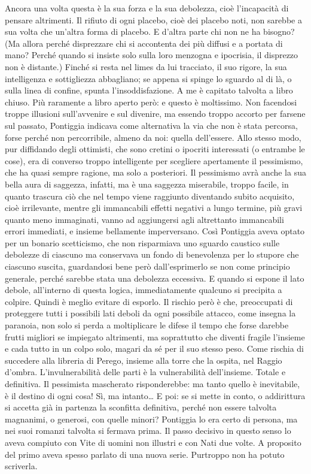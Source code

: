 Ancora una volta questa è la sua forza e la sua debolezza, cioè l’incapacità di pensare altrimenti. Il rifiuto di ogni placebo, cioè dei placebo noti, non sarebbe a sua volta che un’altra forma di placebo. E d’altra parte chi non ne ha bisogno? (Ma allora perché disprezzare chi si accontenta dei più diffusi e a portata di mano? Perché quando si insiste solo sulla loro menzogna e ipocrisia, il disprezzo non è distante.)\newline
Finché si resta nel limes da lui tracciato, il suo rigore, la sua intelligenza e sottigliezza abbagliano; se appena si spinge lo sguardo al di là, o sulla linea di confine, spunta l’insoddisfazione. A me è capitato talvolta a libro chiuso. Più raramente a libro aperto però: e questo è moltissimo.\newline
Non facendosi troppe illusioni sull’avvenire e sul divenire, ma essendo troppo accorto per farsene sul passato, Pontiggia indicava come alternativa la via che non è stata percorsa, forse perché non percorribile, almeno da noi: quella dell’essere.
Allo stesso modo, pur diffidando degli ottimisti, che sono cretini o ipocriti interessati (o entrambe le cose), era di converso troppo intelligente per scegliere apertamente il pessimismo, che ha quasi sempre ragione, ma solo a posteriori. Il pessimismo avrà anche la sua bella aura di saggezza, infatti, ma è una saggezza miserabile, troppo facile, in quanto trascura ciò che nel tempo viene raggiunto diventando subito acquisito, cioè irrilevante, mentre gli immancabili effetti negativi a lungo termine, più gravi quanto meno immaginati, vanno ad aggiungersi agli altrettanto immancabili errori immediati, e insieme bellamente imperversano. Così Pontiggia aveva optato per un bonario scetticismo, che non risparmiava uno sguardo caustico sulle debolezze di ciascuno ma conservava un fondo di benevolenza per lo stupore che ciascuno suscita, guardandosi bene però dall’esprimerlo se non come principio generale, perché sarebbe stata una debolezza eccessiva. E quando si espone il lato debole, all’interno di questa logica, immediatamente qualcuno si precipita a colpire. Quindi è meglio evitare di esporlo. Il rischio però è che, preoccupati di proteggere tutti i possibili lati deboli da ogni possibile attacco, come insegna la paranoia, non solo si perda a moltiplicare le difese il tempo che forse darebbe frutti migliori se impiegato altrimenti, ma soprattutto che diventi fragile l’insieme e cada tutto in un colpo solo, magari da sé per il suo stesso peso. Come rischia di succedere alla libreria di Perego, insieme alla torre che la ospita, nel Raggio d’ombra. L’invulnerabilità delle parti è la vulnerabilità dell’insieme. Totale e definitiva. Il pessimista mascherato risponderebbe: ma tanto quello è inevitabile, è il destino di ogni cosa!
Sì, ma intanto…
E poi: se si mette in conto, o addirittura si accetta già in partenza la sconfitta definitiva, perché non essere talvolta magnanimi, o generosi, con quelle minori? Pontiggia lo era certo di persona, ma nei suoi romanzi talvolta si fermava prima. Il passo decisivo in questo senso lo aveva compiuto con Vite di uomini non illustri e con Nati due volte. A proposito del primo aveva spesso parlato di una nuova serie. Purtroppo non ha potuto scriverla.
